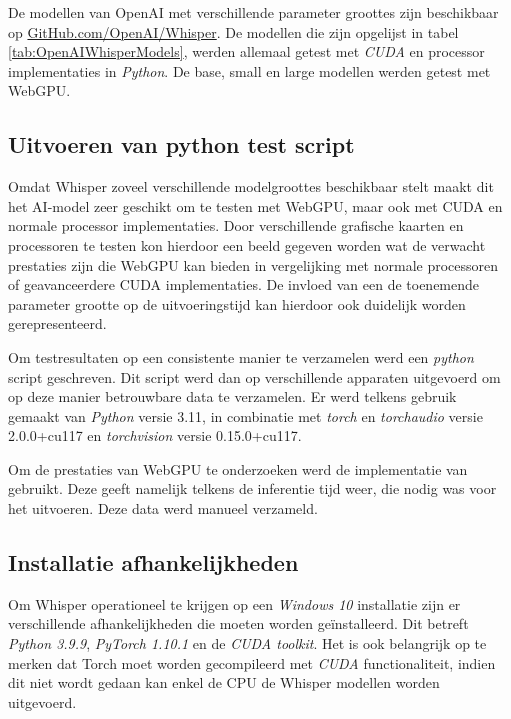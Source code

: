 \bigbreak{}

De modellen van OpenAI met verschillende parameter groottes zijn beschikbaar op \href{https://github.com/openai/whisper}{GitHub.com/OpenAI/Whisper}. De modellen die zijn opgelijst in tabel \ref{tab:OpenAIWhisperModels}, werden allemaal getest met \textit{CUDA} en processor implementaties in \textit{Python}. De base, small en large modellen werden getest met WebGPU.

\break{}

\subsection*{Uitvoeren van python test script}

Omdat Whisper zoveel verschillende modelgroottes beschikbaar stelt maakt dit het AI-model zeer geschikt om te testen met WebGPU, maar ook met CUDA en normale processor implementaties. Door verschillende grafische kaarten en processoren te testen kon hierdoor een beeld gegeven worden wat de verwacht prestaties zijn die WebGPU kan bieden in vergelijking met normale processoren of geavanceerdere CUDA implementaties. De invloed van een de toenemende parameter grootte op de uitvoeringstijd kan hierdoor ook duidelijk worden gerepresenteerd.

\bigbreak{}

Om testresultaten op een consistente manier te verzamelen werd een \textit{python} script geschreven. Dit script werd dan op verschillende apparaten uitgevoerd om op deze manier betrouwbare data te verzamelen. Er werd telkens gebruik gemaakt van \textit{Python} versie 3.11, in combinatie met \textit{torch} en \textit{torchaudio} versie 2.0.0+cu117 en \textit{torchvision} versie 0.15.0+cu117.

\bigbreak{}

Om de prestaties van WebGPU te onderzoeken werd de implementatie van \textcite{Fleetwood2024} gebruikt. Deze geeft namelijk telkens de inferentie tijd weer, die nodig was voor het uitvoeren. Deze data werd manueel verzameld.

\bigbreak{}

\subsection*{Installatie afhankelijkheden}

Om Whisper operationeel te krijgen op een \textit{Windows 10} installatie zijn er verschillende afhankelijkheden die moeten worden geïnstalleerd. Dit betreft \textit{Python 3.9.9}, \textit{PyTorch 1.10.1} en de \textit{CUDA toolkit}. Het is ook belangrijk op te merken dat Torch moet worden gecompileerd met \textit{CUDA} functionaliteit, indien dit niet wordt gedaan kan enkel de CPU de Whisper modellen worden uitgevoerd.

